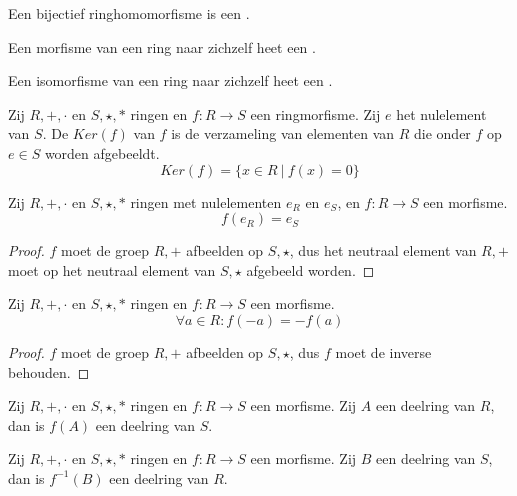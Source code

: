 \documentclass[main.tex]{subfiles}
\begin{document}
\begin{de}
  Een bijectief ringhomomorfisme is een .
\end{de}

\begin{de}
  Een morfisme van een ring naar zichzelf heet een .
\end{de}

\begin{de}
  Een isomorfisme van een ring naar zichzelf heet een .
\end{de}

\begin{de}
  Zij $R,+,\cdot$ en $S,\star,*$ ringen en $f:R \rightarrow S$ een ringmorfisme.
  Zij $e$ het nulelement van $S$.
  De  $Ker(f)$ van $f$ is de verzameling van elementen van $R$ die onder $f$ op $e\in S$ worden afgebeeldt.
  \[ Ker(f) = \{ x \in R \ |\ f(x) = 0 \} \]
\end{de}

\begin{ei}
  Zij $R,+,\cdot$ en $S,\star,*$ ringen met nulelementen $e_{R}$ en $e_{S}$, en $f:R \rightarrow S$ een morfisme.
  \[ f(e_{R}) = e_{S} \]

  \begin{proof}
    $f$ moet de groep $R,+$ afbeelden op $S,\star$, dus het neutraal element van $R,+$ moet op het neutraal element van $S,\star$ afgebeeld worden.
  \end{proof}
\end{ei}
 
\begin{ei}
  Zij $R,+,\cdot$ en $S,\star,*$ ringen en $f:R \rightarrow S$ een morfisme.
  \[ \forall a \in R: f(-a) = -f(a) \]
  \begin{proof}
    $f$ moet de groep $R,+$ afbeelden op $S,\star$, dus $f$ moet de inverse behouden.
  \end{proof}
\end{ei}

\begin{ei}
  Zij $R,+,\cdot$ en $S,\star,*$ ringen en $f:R \rightarrow S$ een morfisme.
  Zij $A$ een deelring van $R$, dan is $f(A)$ een deelring van $S$.
\end{ei}

\begin{ei}
  Zij $R,+,\cdot$ en $S,\star,*$ ringen en $f:R \rightarrow S$ een morfisme.
  Zij $B$ een deelring van $S$, dan is $f^{-1}(B)$ een deelring van $R$.
\end{ei}
\end{document}
